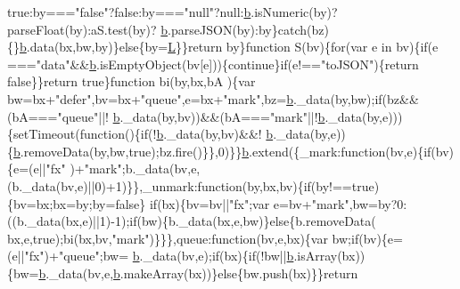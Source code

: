 \begin{DoxyCode}
{      true}:by===\textcolor{stringliteral}{"false"}?\textcolor{keyword}{false}:by===\textcolor{stringliteral}{"null"}?null:\hyperlink{a00039_aa4026ad5544b958e54ce5e106fa1c805}{b}.isNumeric(by)?parseFloat(by):aS.test(by)?
      \hyperlink{a00039_aa4026ad5544b958e54ce5e106fa1c805}{b}.parseJSON(by):by\}catch(bz)\{\}\hyperlink{a00039_aa4026ad5544b958e54ce5e106fa1c805}{b}.data(bx,bw,by)\}\textcolor{keywordflow}{else}\{by=\hyperlink{a00039_a38ee4c0b5f4fe2a18d0c783af540d253}{L}\}\}\textcolor{keywordflow}{return} by\}\textcolor{keyword}{function} S(bv)\{\textcolor{keywordflow}{for}(var e in bv)\{\textcolor{keywordflow}{if}(e
      ===\textcolor{stringliteral}{"data"}&&\hyperlink{a00039_aa4026ad5544b958e54ce5e106fa1c805}{b}.isEmptyObject(bv[e]))\{\textcolor{keywordflow}{continue}\}\textcolor{keywordflow}{if}(e!==\textcolor{stringliteral}{"toJSON"})\{\textcolor{keywordflow}{return} \textcolor{keyword}{false}\}\}\textcolor{keywordflow}{return} \textcolor{keyword}{true}\}\textcolor{keyword}{function} bi(by,bx,bA
      )\{var bw=bx+\textcolor{stringliteral}{"defer"},bv=bx+\textcolor{stringliteral}{"queue"},e=bx+\textcolor{stringliteral}{"mark"},bz=\hyperlink{a00039_aa4026ad5544b958e54ce5e106fa1c805}{b}.\_data(by,bw);\textcolor{keywordflow}{if}(bz&&(bA===\textcolor{stringliteral}{"queue"}||!
      \hyperlink{a00039_aa4026ad5544b958e54ce5e106fa1c805}{b}.\_data(by,bv))&&(bA===\textcolor{stringliteral}{"mark"}||!\hyperlink{a00039_aa4026ad5544b958e54ce5e106fa1c805}{b}.\_data(by,e)))\{setTimeout(\textcolor{keyword}{function}()\{\textcolor{keywordflow}{if}(!\hyperlink{a00039_aa4026ad5544b958e54ce5e106fa1c805}{b}.\_data(by,bv)&&!
      \hyperlink{a00039_aa4026ad5544b958e54ce5e106fa1c805}{b}.\_data(by,e))\{\hyperlink{a00039_aa4026ad5544b958e54ce5e106fa1c805}{b}.removeData(by,bw,\textcolor{keyword}{true});bz.fire()\}\},0)\}\}\hyperlink{a00039_aa4026ad5544b958e54ce5e106fa1c805}{b}.extend(\{\_mark:function(bv,e)\{if(bv)\{e=(e||\textcolor{stringliteral}{"fx"}
      )+\textcolor{stringliteral}{"mark"};b.\_data(bv,e,(b.\_data(bv,e)||0)+1)\}\},\_unmark:\textcolor{keyword}{function}(by,bx,bv)\{if(by!==true)\{bv=bx;bx=by;by=false\}\textcolor{keywordflow}{
      if}(bx)\{bv=bv||\textcolor{stringliteral}{"fx"};var e=bv+\textcolor{stringliteral}{"mark"},bw=by?0:((b.\_data(bx,e)||1)-1);if(bw)\{b.\_data(bx,e,bw)\}\textcolor{keywordflow}{else}\{b.removeData(
      bx,e,true);bi(bx,bv,\textcolor{stringliteral}{"mark"})\}\}\},queue:\textcolor{keyword}{function}(bv,e,bx)\{var bw;\textcolor{keywordflow}{if}(bv)\{e=(e||\textcolor{stringliteral}{"fx"})+\textcolor{stringliteral}{"queue"};bw=
      \hyperlink{a00039_aa4026ad5544b958e54ce5e106fa1c805}{b}.\_data(bv,e);\textcolor{keywordflow}{if}(bx)\{\textcolor{keywordflow}{if}(!bw||\hyperlink{a00039_aa4026ad5544b958e54ce5e106fa1c805}{b}.isArray(bx))\{bw=\hyperlink{a00039_aa4026ad5544b958e54ce5e106fa1c805}{b}.\_data(bv,e,\hyperlink{a00039_aa4026ad5544b958e54ce5e106fa1c805}{b}.makeArray(bx))\}\textcolor{keywordflow}{else}\{bw.push(bx)\}\}\textcolor{keywordflow}{return} 

\end{DoxyCode}
